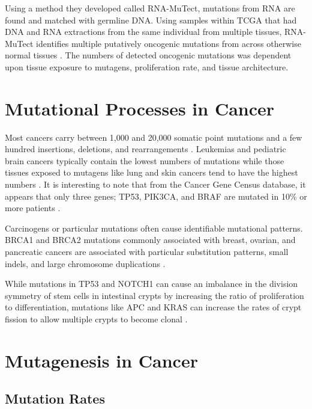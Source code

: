 \documentclass[]{book}
\begin{document}
Using a method they developed called RNA-MuTect, mutations from RNA are
found and matched with germline DNA. Using samples within TCGA that had
DNA and RNA extractions from the same individual from multiple tissues,
RNA-MuTect identifies multiple putatively oncogenic mutations from
across otherwise normal tissues \citep{Yizhak2019-ch}. The numbers of
detected oncogenic mutations was dependent upon tissue exposure to
mutagens, proliferation rate, and tissue architecture.

\section{Mutational Processes in
Cancer}\label{mutational-processes-in-cancer}

Most cancers carry between 1,000 and 20,000 somatic point mutations and
a few hundred insertions, deletions, and rearrangements
\citep{martincorena2015somatic}. Leukemias and pediatric brain cancers
typically contain the lowest numbers of mutations while those tissues
exposed to mutagens like lung and skin cancers tend to have the highest
numbers
\citep{stephens2009complex, alexandrov2013signatures, lawrence2013mutational, vogelstein2013cancer}.
It is interesting to note that from the Cancer Gene Census database, it
appears that only three genes; TP53, PIK3CA, and BRAF are mutated in
10\% or more patients \citep{martincorena2015somatic}.

Carcinogens or particular mutations often cause identifiable mutational
patterns. BRCA1 and BRCA2 mutations commonly associated with breast,
ovarian, and pancreatic cancers are associated with particular
substitution patterns, small indels, and large chromosome duplications
\citep{nik2012mutational}.

While mutations in TP53 and NOTCH1 can cause an imbalance in the
division symmetry of stem cells in intestinal crypts by increasing the
ratio of proliferation to
differentiation\citep{klein2010stochastic, alcolea2014differentiation},
mutations like APC and KRAS can increase the rates of crypt fission to
allow multiple crypts to become clonal
\citep{preston2003bottom, snippert2014biased}.

\section{Mutagenesis in Cancer}\label{mutagenesis-in-cancer}

\subsection{Mutation Rates}\label{mutation-rates}
\end{document}
